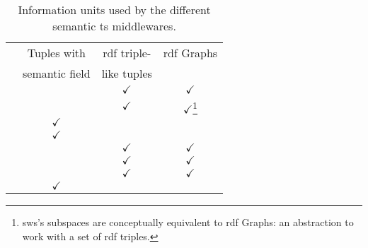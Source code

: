 
\begin{savenotes}
  \begin{table}[htbp]
    \caption{Information units used by the different semantic \ac{ts} middlewares.}
    \centering
    \begin{tabular}{ l c c c }
      \hline 
	& Tuples with & \ac{rdf} triple- & \ac{rdf} Graphs \\
	& semantic field & like tuples & \\
      \hline 
      \midtsc{} & & $\checkmark$ & $\checkmark$ \\ %
      \midsws{} & & $\checkmark$ & $\checkmark$\footnote{\ac{sws}'s subspaces are conceptually equivalent to \ac{rdf} Graphs: an abstraction to work with a set of \ac{rdf} triples.} \\
      \midstuples{} & $\checkmark$ & & \\
      \midcspaces{} & $\checkmark$ & & \\ %
      \midtscpp{} & & $\checkmark$ & $\checkmark$ \\
      \midtripcom{} & & $\checkmark$ & $\checkmark$ \\
      \midsmartmt{} & & $\checkmark$ & $\checkmark$ \\
      \midnardini{} & $\checkmark$ & & \\
      \hline 
    \end{tabular}
    \label{tab:comparisonTS}
  \end{table}
\end{savenotes}